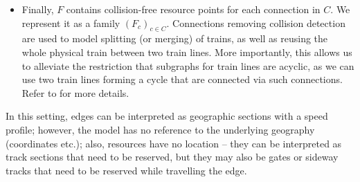 \documentclass{article}
\begin{document}
\begin{itemize}
    \item Finally, $F$ contains collision-free resource points for each connection in $C$. We represent it as a family $(F_c)_{c\in C}$. Connections removing collision detection are used to model splitting (or merging) of trains, as well as reusing the whole physical train between two train lines. More importantly, this allows us to alleviate the restriction that subgraphs for train lines are acyclic, as we can use two train lines forming a cycle that are connected via such connections. Refer to \cite{DBLP:journals/corr/abs-2003-08598} for more details.
\end{itemize}
In this setting, edges can be interpreted as geographic sections with a speed profile; however, the model has no reference to the underlying geography (coordinates etc.); also, resources have no location -- they can be interpreted as track sections that need to be reserved, but they may also be gates or sideway tracks that need to be reserved while travelling the edge.
\end{document}
